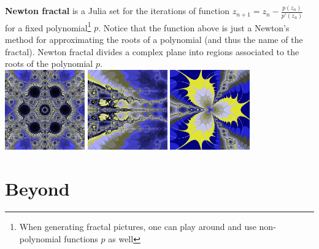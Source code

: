 \documentclass[12pt]{article}
\begin{document}
\noindent\textbf{Newton fractal} is a Julia set for the iterations of function $z_{n+1} = z_n - \frac{p(z_n)}{p'(z_n)}$ for a fixed polynomial\footnote{When generating fractal pictures, one can play around and use non-polynomial functions $p$ as well} $p$. Notice that the function above is just a Newton's method for approximating the roots of a polynomial (and thus the name of the fractal). Newton fractal divides a complex plane into regions associated to the roots of the polynomial $p$.\\
\includegraphics[width = 130px]{example1}
\includegraphics[width = 130px]{example3}
\includegraphics[width = 130px]{example5}

\section{Beyond}
\end{document}
